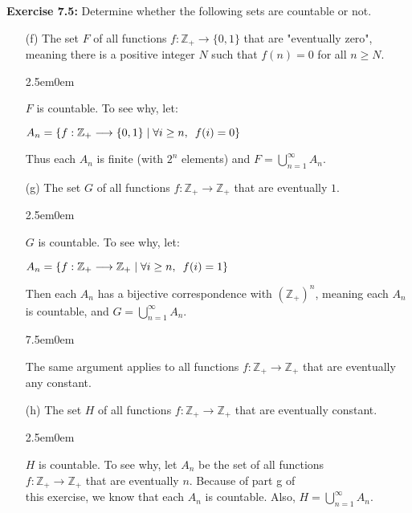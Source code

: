 \documentclass{book}
\newcommand{\myComment}{%
   \color{RawerSienna}%
   \fontsize{12}{14}\selectfont%
}
\newcommand{\exTwo}{%
\color{Purple}%
   \fontsize{13}{15}\selectfont%
}
\newenvironment{myIndent}{%
   \begin{adjustwidth}{2.5em}{0em}%
}{%
   \end{adjustwidth}%
}
\newenvironment{myTindent}{%
   \begin{adjustwidth}{7.5em}{0em}%
}{%
   \end{adjustwidth}%
}
\newcommand{\blab}[1]{\textbf{#1}}
\newcommand{\myHS}{ \hspace{0.5em}}
\newcommand{\retTwo}{\hfill\bigbreak}
\begin{document}
   \blab{Exercise 7.5:} Determine whether the following sets are countable or not.
   \begin{itemize}
      \item[(f)] The set $F$ of all functions $f: \mathbb{Z}_+ \longrightarrow \{0, 1\}$ that are "eventually zero", meaning there is a positive integer $N$ such that $f(n) = 0$ for all $n \geq N$.
      
      \begin{myIndent}\exTwo
         $F$ is countable. To see why, let:
         
         {\centering $A_n = \{f: \mathbb{Z}_+ \longrightarrow \{0, 1\} \mid \forall i \geq n, \myHS f(i) = 0\}$\retTwo\par}
         
         Thus each $A_n$ is finite (with $2^n$ elements) and $F = \bigcup\limits_{n = 1}^\infty A_n$.\newpage
      \end{myIndent}

      \item[(g)] The set $G$ of all functions $f: \mathbb{Z}_+ \longrightarrow \mathbb{Z}_+$ that are eventually $1$.
      
      \begin{myIndent}\exTwo
         $G$ is countable. To see why, let:

         {\centering $A_n = \{f: \mathbb{Z}_+ \longrightarrow \mathbb{Z}_+ \mid \forall i \geq n, \myHS f(i) = 1\}$\retTwo\par}

         Then each $A_n$ has a bijective correspondence with $(\mathbb{Z}_+)^n$, meaning each $A_n$ is countable, and $G = \bigcup\limits_{n = 1}^\infty A_n$.
         
         \begin{myTindent}\myComment
            The same argument applies to all functions $f: \mathbb{Z}_+ \longrightarrow \mathbb{Z}_+$ that are eventually any constant.\retTwo
         \end{myTindent}
      \end{myIndent}

      \item[(h)] The set $H$ of all functions $f: \mathbb{Z}_+ \longrightarrow \mathbb{Z}_+$ that are eventually constant.
      
      \begin{myIndent}\exTwo
         $H$ is countable. To see why, let $A_n$ be the set of all functions\\ $f: \mathbb{Z}_+ \longrightarrow \mathbb{Z}_+$ that are eventually $n$. Because of part g of\\ [-6pt] this exercise, we know that each $A_n$ is countable. Also, $H = \bigcup\limits_{n = 1}^\infty A_n$.\retTwo
      \end{myIndent}


\end{itemize}
\end{document}
